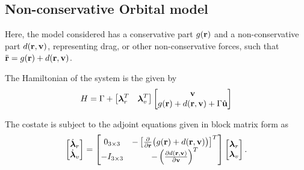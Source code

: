 


\subsection{Non-conservative Orbital model}

Here, the model considered has a conservative part \(g(\mathbf{r})\) and a non-conservative part \(d(\mathbf{r}, \mathbf{v})\), representing drag, or other non-conservative forces, such that \(\ddot{\mathbf{r}} = g(\mathbf{r}) + d(\mathbf{r}, \mathbf{v})\).

The Hamiltonian of the system is the given by
\begin{equation}
    H = \Gamma + \begin{bmatrix}
        \boldsymbol{\lambda}_r^T & \boldsymbol{\lambda}_v^T
    \end{bmatrix} \begin{bmatrix}
        \mathbf{v} \\ g(\mathbf{r}) + d(\mathbf{r}, \mathbf{v}) + \Gamma \hat{\mathbf{u}}
    \end{bmatrix}
\end{equation}

The costate is subject to the adjoint equations given in block matrix form as
\begin{equation}\label{eq:lambda_dot_ncon}
    \begin{bmatrix}
        \dot{\boldsymbol{\lambda}}_r \\ \dot{\boldsymbol{\lambda}}_v
    \end{bmatrix} = \begin{bmatrix}
        0_{3\times3} & -\left[\frac{\partial }{\partial \mathbf{r}}\big(g(\mathbf{r}) + d(\pos, \vel)\big)\right]^T \\
        -I_{3\times3} & -\left(\frac{\partial d(\pos, \vel)}{\partial \vel}\right)^T 
    \end{bmatrix} \begin{bmatrix}
        \boldsymbol{\lambda}_r \\ \boldsymbol{\lambda}_v
    \end{bmatrix}.
\end{equation}

